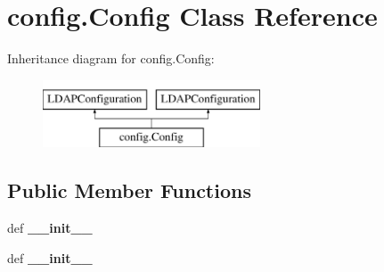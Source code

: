 \hypertarget{classconfig_1_1Config}{\section{config.\-Config Class Reference}
\label{classconfig_1_1Config}
}
Inheritance diagram for config.\-Config\-:\begin{figure}[H]
\begin{center}
\leavevmode
\includegraphics[height=2.000000cm]{classconfig_1_1Config}
\end{center}
\end{figure}
\subsection*{Public Member Functions}
\begin{DoxyCompactItemize}
\item 
\hypertarget{classconfig_1_1Config_a2c77f4b64c0bf70b283cdb4af4c93fa1}{def {\bfseries \-\_\-\-\_\-init\-\_\-\-\_\-}}\label{classconfig_1_1Config_a2c77f4b64c0bf70b283cdb4af4c93fa1}

\item 
\hypertarget{classconfig_1_1Config_a2c77f4b64c0bf70b283cdb4af4c93fa1}{def {\bfseries \-\_\-\-\_\-init\-\_\-\-\_\-}}\label{classconfig_1_1Config_a2c77f4b64c0bf70b283cdb4af4c93fa1}

\end{DoxyCompactItemize}
